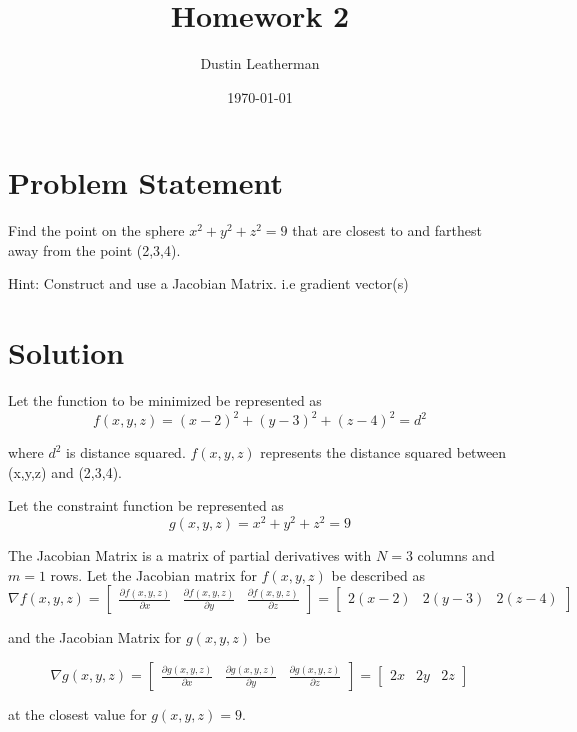 \documentclass[11pt]{article}
\author{Dustin Leatherman}
\date{\today}
\title{Homework 2}
\begin{document}
\maketitle
\tableofcontents


\section{Problem Statement}
\label{sec:org2d4f75c}

Find the point on the sphere \(x^2 + y^2 + z^2 = 9\) that are closest to and
farthest away from the point (2,3,4).


Hint: Construct and use a Jacobian Matrix. i.e gradient vector(s)

\section{Solution}
\label{sec:orgcfc2023}

Let the function to be minimized be represented as
$$
f(x,y,z) = (x - 2)^2 + (y - 3)^2 + (z - 4)^2 = d^2
$$

where \(d^2\) is distance squared. \(f(x,y,z)\) represents the distance squared between (x,y,z) and
(2,3,4).

Let the constraint function be represented as
$$
g(x,y,z) = x^2 + y^2 + z^2 = 9
$$

The Jacobian Matrix is a matrix of partial derivatives with \(N = 3\) columns and
\(m = 1\) rows. Let the Jacobian matrix for \(f(x,y,z)\) be described as
$$
\nabla f(x,y,z) = \begin{bmatrix}
\frac{\partial f(x,y,z)}{\partial x} & \frac{\partial f(x,y,z)}{\partial y} &
\frac{\partial f(x,y,z)}{\partial z}
\end{bmatrix} = \begin{bmatrix}
2(x - 2) & 2(y - 3) & 2(z - 4)
\end{bmatrix}
$$

and the Jacobian Matrix for \(g(x,y,z)\) be

$$
\nabla g(x,y,z) = \begin{bmatrix}
\frac{\partial g(x,y,z)}{\partial x} & \frac{\partial g(x,y,z)}{\partial y} &
\frac{\partial g(x,y,z)}{\partial z}
\end{bmatrix} = \begin{bmatrix}
2x & 2y & 2z
\end{bmatrix}
$$

at the closest value for \(g(x,y,z) = 9\).
\end{document}
